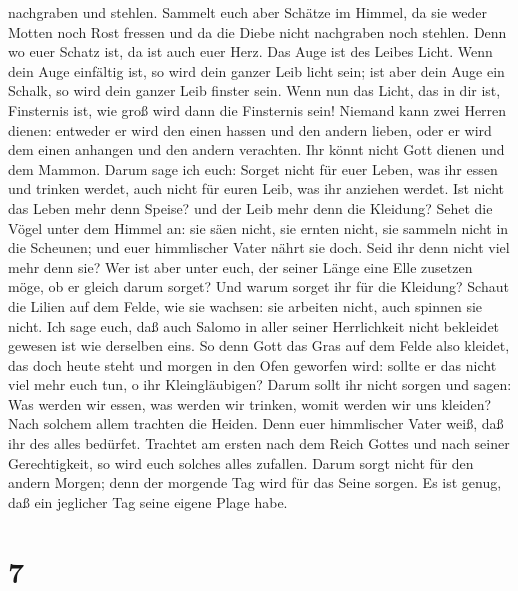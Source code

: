 nachgraben und stehlen.  Sammelt euch aber Schätze im
Himmel, da sie weder Motten noch Rost fressen und da die Diebe nicht
nachgraben noch stehlen.  Denn wo euer Schatz ist, da ist
auch euer Herz.  Das Auge ist des Leibes Licht. Wenn dein
Auge einfältig ist, so wird dein ganzer Leib licht sein; 
ist aber dein Auge ein Schalk, so wird dein ganzer Leib finster sein.
Wenn nun das Licht, das in dir ist, Finsternis ist, wie groß wird dann
die Finsternis sein!  Niemand kann zwei Herren dienen:
entweder er wird den einen hassen und den andern lieben, oder er wird
dem einen anhangen und den andern verachten. Ihr könnt nicht Gott dienen
und dem Mammon.  Darum sage ich euch: Sorget nicht für euer
Leben, was ihr essen und trinken werdet, auch nicht für euren Leib, was
ihr anziehen werdet. Ist nicht das Leben mehr denn Speise? und der Leib
mehr denn die Kleidung?  Sehet die Vögel unter dem Himmel
an: sie säen nicht, sie ernten nicht, sie sammeln nicht in die Scheunen;
und euer himmlischer Vater nährt sie doch. Seid ihr denn nicht viel mehr
denn sie?  Wer ist aber unter euch, der seiner Länge eine
Elle zusetzen möge, ob er gleich darum sorget?  Und warum
sorget ihr für die Kleidung? Schaut die Lilien auf dem Felde, wie sie
wachsen: sie arbeiten nicht, auch spinnen sie nicht.  Ich
sage euch, daß auch Salomo in aller seiner Herrlichkeit nicht bekleidet
gewesen ist wie derselben eins.  So denn Gott das Gras auf
dem Felde also kleidet, das doch heute steht und morgen in den Ofen
geworfen wird: sollte er das nicht viel mehr euch tun, o ihr
Kleingläubigen?  Darum sollt ihr nicht sorgen und sagen:
Was werden wir essen, was werden wir trinken, womit werden wir uns
kleiden?  Nach solchem allem trachten die Heiden. Denn euer
himmlischer Vater weiß, daß ihr des alles bedürfet. 
Trachtet am ersten nach dem Reich Gottes und nach seiner Gerechtigkeit,
so wird euch solches alles zufallen.  Darum sorgt nicht für
den andern Morgen; denn der morgende Tag wird für das Seine sorgen. Es
ist genug, daß ein jeglicher Tag seine eigene Plage habe.

\hypertarget{section-6}{%
\section{7}\label{section-6}}

